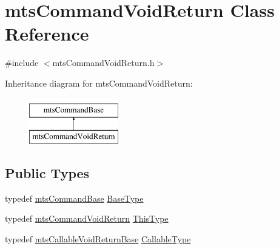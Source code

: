 \hypertarget{classmts_command_void_return}{}\section{mts\+Command\+Void\+Return Class Reference}
\label{classmts_command_void_return}


{\ttfamily \#include $<$mts\+Command\+Void\+Return.\+h$>$}

Inheritance diagram for mts\+Command\+Void\+Return\+:\begin{figure}[H]
\begin{center}
\leavevmode
\includegraphics[height=2.000000cm]{d2/d20/classmts_command_void_return}
\end{center}
\end{figure}
\subsection*{Public Types}
\begin{DoxyCompactItemize}
\item 
typedef \hyperlink{classmts_command_base}{mts\+Command\+Base} \hyperlink{classmts_command_void_return_a41ef4fa87ecb46aec2235730bdcc1088}{Base\+Type}
\item 
typedef \hyperlink{classmts_command_void_return}{mts\+Command\+Void\+Return} \hyperlink{classmts_command_void_return_ae77b9e228137e3c73a41fbd1f38ee7fd}{This\+Type}
\item 
typedef \hyperlink{classmts_callable_void_return_base}{mts\+Callable\+Void\+Return\+Base} \hyperlink{classmts_command_void_return_a101cc8bc0761aa0ab210c4f6d59ad81c}{Callable\+Type}
\end{DoxyCompactItemize}
